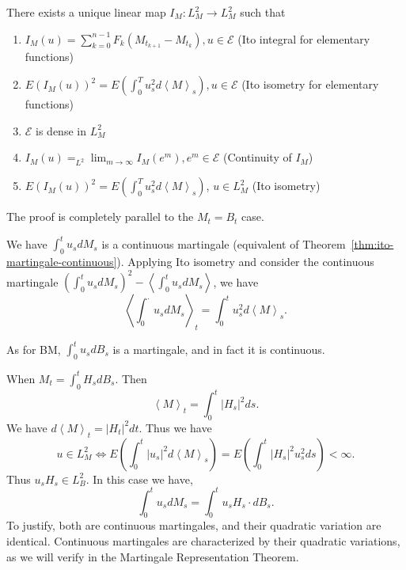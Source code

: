 \begin{theorem}
	There exists a unique linear map $I_M: L^2_M \to  L^2_M$ such that
	\begin{enumerate}
		\item $I_M(u) = \sum_{k = 0}^{n - 1} F_k \left( M_{t_{k+1}} - M_{t_k} \right) , u \in \mathcal{E}$ (Ito integral for elementary functions)
		\item $E\left( I_M(u) \right) ^2 = E\left( \int _0^T u_s^2 d \left\langle M \right\rangle _s \right) , u \in \mathcal{E}$ (Ito isometry for elementary functions)
		\item $\mathcal{E}$ is dense in $L^2_M$
		\item  $I_M(u) =_{L^2} \lim_{m \to \infty} I_M(e^m), e^m \in \mathcal{E}$ (Continuity of $I_M$)
		\item $E\left( I_M(u) \right) ^2 = E\left( \int _0^T u_s^2 d \left\langle M \right\rangle _s \right) $, $u \in L^2_M$ (Ito isometry)
	\end{enumerate}
\end{theorem}
The proof is completely parallel to the $M_t = B_t$ case.

\begin{remark}
	We have $\int _0^t u_s d M_s$ is a continuous martingale (equivalent of Theorem~\ref{thm:ito-martingale-continuous}).
	Applying Ito isometry and consider the continuous martingale $\left( \int _0^t u_s d M_s \right) ^2 - \left\langle \int _0^t u_s d M_s \right\rangle $, we have
	\[
		\left\langle \int _0^\cdot u_s d M_s \right\rangle _t = \int _0^t u_s^2 d \left\langle M \right\rangle _s
	.\] 
\end{remark}

\begin{example}
	As for BM,  $\int _0^t u_s d B_s$ is a martingale, and in fact it is continuous.
\end{example}
\begin{example}
	When $M_t  = \int _0^t H_s d B_s$. Then
	\[
		\left\langle M \right\rangle _t = \int _0^t |H_s|^2 ds
	.\] 
	We have $d \left\langle M \right\rangle _t = |H_t|^2 dt$. Thus we have
	\[
		u \in L_M^2 \iff  
		E\left( \int _0^t |u_s|^2 d \left\langle M \right\rangle _s \right)  = E \left( \int _0^t |H_s|^2 u_s^2 ds \right)  < \infty 
	.\] 
	Thus $u_s H_s \in L_B^2$. 
	In this case we have,
	\[
		\int _0^t u_s d M_s = \int _0^t u_s H_s \cdot d B_s
	.\] 
	To justify, both are continuous martingales, and their quadratic variation are identical. Continuous martingales are characterized by their quadratic variations, as we will verify in the Martingale Representation Theorem.
\end{example}

